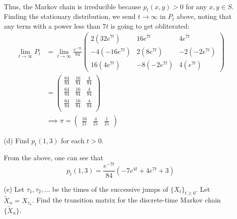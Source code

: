 \documentclass[11pt]{article}
\begin{document}
\begin{enumerate}
\begin{solution}
\begin{align*}
    \end{align*}
    Thus, the Markov chain is irreducible because $p_t(x,y) >0$ for any $x,y \in S.$ Finding the stationary distribution, we send $t\to \infty$ in $P_t$ above, noting that any term with a power less than $7t$ is going to get obliterated:
\begin{align*}
    \lim_{t\to \infty}P_t &= \lim_{t\to \infty} \frac{e^{-7t}}{84}
\begin{pmatrix} 
2\left(32 e^{7t}\right) & 16 e^{7t}& 4e^{7t} \\
-4\left( - 16 e^{7t}\right) & 2\left(8 e^{7t} \right) & -2\left(- 2 e^{7t} \right) \\
16\left(4 e^{7t}\right) & -8\left(- 2 e^{7t} \right) & 4\left( e^{7t}\right)
\end{pmatrix}\\
&= \begin{pmatrix}
    \frac{64}{84} & \frac{16}{84} & \frac{4}{84}\\
    \frac{64}{84} & \frac{16}{84} & \frac{4}{84}\\
    \frac{64}{84} & \frac{16}{84} & \frac{4}{84}\\
\end{pmatrix}\\
&\implies \pi = \begin{pmatrix}
    \frac{16}{21} & \frac{4}{21} & \frac{1}{21}
\end{pmatrix}
\end{align*}
\end{solution}
    \item[(d)] Find \(p_t(1,3)\) for each \(t > 0\).
    \begin{solution}
        From the above, one can see that 
        \[p_t (1,3) = \frac{e^{-7t}}{84}(-7 e^{4t} + 4 e^{7t} + 3 )\]
    \end{solution}
    \item[(e)] Let \(\tau_1, \tau_2, \ldots\) be the times of the successive jumps of \(\{X_t\}_{t \geq 0}\). Let \(\tilde{X}_n = X_{\tau_n}\). Find the transition matrix for the discrete-time Markov chain \(\{\tilde{X}_n\}\).
\end{enumerate}




\newpage
\end{document}
